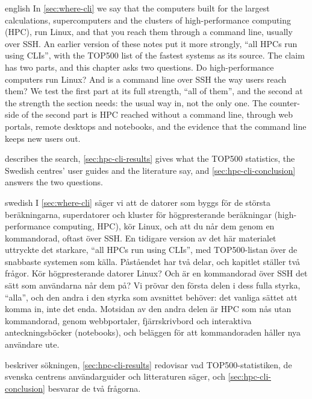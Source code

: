 
\begin{onlyin}{english} %
In \cref{sec:where-cli} we say that the computers built for the largest
calculations, supercomputers and the clusters of high-performance
computing (HPC), run Linux, and that you reach them through a command
line, usually over SSH.  An earlier version of these notes put it more
strongly, \enquote{all HPCs run using CLIs}, with the TOP500 list of the
fastest systems as its source.  The claim has two parts, and this chapter
asks two questions.  Do high-performance computers run Linux?  And is a
command line over SSH the way users reach them?  We test the first part
at its full strength, \enquote{all of them}, and the second at the
strength the section needs: the usual way in, not the only one.  The
counter-side of the second part is HPC reached without a command line,
through web portals, remote desktops and notebooks, and the evidence that
the command line keeps new users out.

 describes the search, \cref{sec:hpc-cli-results}
gives what the TOP500 statistics, the Swedish centres' user guides and the
literature say, and \cref{sec:hpc-cli-conclusion} answers the two
questions.
\end{onlyin}
\begin{onlyin}{swedish}
I \cref{sec:where-cli} säger vi att de datorer som byggs för de största
beräkningarna, superdatorer och kluster för högpresterande beräkningar
(\foreignlanguage{english}{high-performance computing}, HPC), kör Linux,
och att du når dem genom en kommandorad, oftast över SSH.  En tidigare
version av det här materialet uttryckte det starkare,
\foreignlanguage{english}{\enquote{all HPCs run using CLIs}}, med
TOP500-listan över de snabbaste systemen som källa.  Påståendet har två
delar, och kapitlet ställer två frågor.  Kör högpresterande datorer
Linux?  Och är
en kommandorad över SSH det sätt som användarna når dem på?  Vi prövar
den första delen i dess fulla styrka, \enquote{alla}, och den andra i den
styrka som avsnittet behöver: det vanliga sättet att komma in, inte det
enda.  Motsidan av den andra delen är HPC som nås utan kommandorad,
genom webbportaler, fjärrskrivbord och interaktiva anteckningsböcker
(\foreignlanguage{english}{notebooks}), och beläggen för att
kommandoraden håller nya användare ute.

 beskriver sökningen, \cref{sec:hpc-cli-results}
redovisar vad TOP500-statistiken, de svenska centrens användarguider och
litteraturen säger, och \cref{sec:hpc-cli-conclusion} besvarar de två
frågorna.
\end{onlyin}


